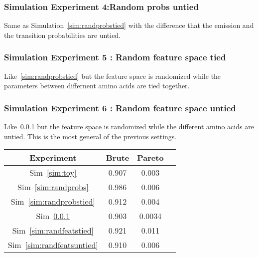 \documentclass{article}
\begin{document}
\subsubsection{Simulation Experiment 4:Random probs untied}
\label{sim:randprobsuntied}
Same as Simulation~\ref{sim:randprobstied} with the difference that the emission and the transition probabilities are untied. 

\subsubsection{Simulation Experiment 5 : Random feature space tied}
Like~\ref{sim:randprobstied} but the feature space is randomized while the parameters between differnent amino acids are tied together. 
\label{sim:randfeatstied}

\subsubsection{Simulation Experiment 6 :  Random feature space untied}
Like~\ref{sim:randprobsuntied} but the feature space is randomized while the different amino acids are untied. This is the most general of the previous settings. 
\label{sim:randfeatsuntied}


\begin{center}
    \begin{tabular}{| c | c | c | c |}
    \hline
    Experiment & Brute & Pareto \\ \hline
    Sim~\ref{sim:toy} & 0.907 & 0.003 \\ \hline
    Sim~\ref{sim:randprobs} & 0.986 & 0.006 \\ \hline
    Sim~\ref{sim:randprobstied} & 0.912 & 0.004 \\ \hline
    Sim~\ref{sim:randprobsuntied} & 0.903 & 0.0034\\ \hline
    Sim~\ref{sim:randfeatstied} & 0.921 & 0.011 \\ \hline
    Sim~\ref{sim:randfeatsuntied} & 0.910 & 0.006 \\ \hline
    \hline
    \end{tabular}
\end{center}
\end{document}
